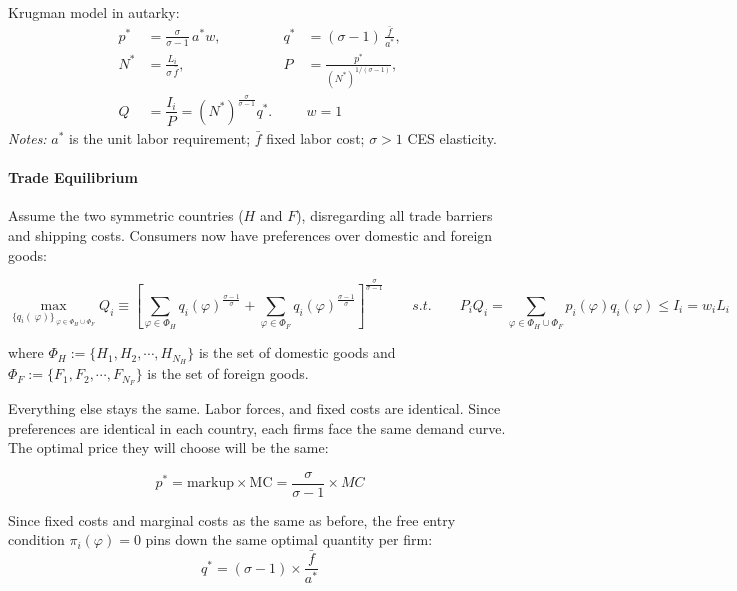 \documentclass[11pt,letterpaper]{article}
\begin{document}
\begin{center}
Krugman model in autarky:
\[
\boxed{
\begin{aligned}
p^{*} &= \frac{\sigma}{\sigma-1}\,a^{*}w, &
q^{*} &= (\sigma-1)\,\frac{\bar f}{a^{*}}, \\
N^{*} &= \frac{L_i}{\sigma\,\bar f}, &
P &= \frac{p^{*}}{(N^{*})^{1/(\sigma-1)}}, \\
Q &= \dfrac{I_i}{P} = (N^{*})^{\frac{\sigma}{\sigma-1}} q^*. && w=1
\end{aligned}
}
\]
\small\emph{Notes:} $a^{*}$ is the unit labor requirement; $\bar f$ fixed labor cost; $\sigma>1$ CES elasticity.
\end{center}

\paragraph{Trade Equilibrium}

Assume the two symmetric countries ($H$ and $F$), disregarding all trade barriers and shipping costs. Consumers now have preferences over domestic and foreign goods:

\begin{equation*}
    \max_{\{q_i(\
\varphi)\}_{\
\varphi \in \Phi_H \cup \Phi_F}} Q_i \equiv \left[ \sum_{\varphi \in \Phi_H } q_i(
\varphi)^{\tfrac{\sigma-1}{\sigma}} +\sum_{\varphi \in \Phi_F } q_i(
\varphi)^{\tfrac{\sigma-1}{\sigma}} \right]^{\tfrac{\sigma}{\sigma-1} } \qquad s.t. \qquad  P_i Q_i =\sum_{\varphi \in \Phi_H \cup \Phi_F } p_i(\varphi) q_i(\varphi) \le I_i = w_i L_i 
\end{equation*}

\noindent where $\Phi_H := \{ H_1, H_2, \cdots,H_{N_H} \}$ is the set of domestic goods and $\Phi_F := \{ F_1, F_2, \cdots,F_{N_F} \}$ is the set of foreign goods. 

Everything else stays the same. Labor forces, and fixed costs are identical. Since preferences are identical in each country, each firms face the same demand curve. The optimal price they will choose will be the same:

\begin{equation*}
    p^* = \text{markup} \times \text{MC} = \frac{\sigma}{\sigma-1} \times MC
\end{equation*}

Since fixed costs and marginal costs as the same as before, the free entry condition $\pi_i(\varphi) =0$ pins down the same optimal quantity per firm:
\begin{equation*}
    q^* = (\sigma-1) \times \frac{\bar{f}}{a^*}
\end{equation*}
\end{document}
